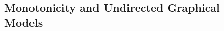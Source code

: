 \begin{subappendices}
\section{Monotonicity and Undirected Graphical Models}
    \label{sec:monotone}
    \label{appendix:undirected PGMs}



\end{subappendices}
